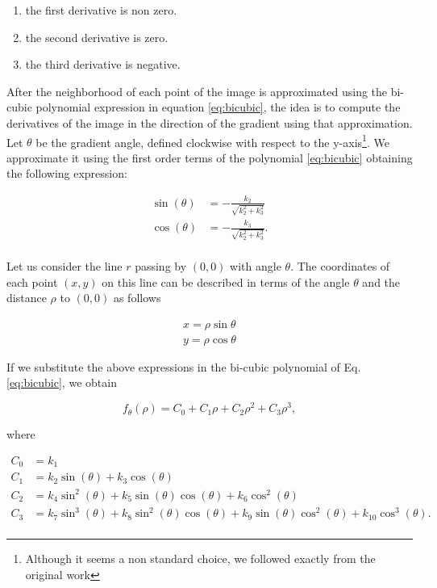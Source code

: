 \documentclass{ipol}
\numberwithin{equation}{section}
\numberwithin{table}{section}
\begin{document}
\begin{enumerate}
\item the first derivative is non zero.
\item the second derivative is zero.
\item the third derivative is negative.
\end{enumerate}

After the neighborhood of each point of the image is approximated using the bi-cubic polynomial expression in equation \ref{eq:bicubic}, the idea is to compute the derivatives of the image in the direction of the gradient using that approximation.\\

Let $\theta$ be the gradient angle, defined clockwise with respect to the y-axis\footnote{Although it seems a non standard choice, we followed exactly from the original work}. We approximate it using the first order terms of the polynomial \ref{eq:bicubic} obtaining the following expression:

\begin{align}
\label{eq:sincos}
	\sin(\theta) & = -\frac{k_2}{\sqrt{k_2^2 + k_3^2}} \nonumber \\
	\cos(\theta) & = -\frac{k_3}{\sqrt{k_2^2 + k_3^2}}. \\
\end{align}

Let us consider the line $r$ passing by $(0,0)$ with angle $\theta$. The coordinates of each point $(x,y)$ on this line can be described in terms of  the angle $\theta$ and the distance $\rho$ to $(0,0)$ as follows

\myn{\label{second:haralick:analytical:coordinates}} 
\begin{align*}
	x = \rho\sin{\theta} \\
	y = \rho\cos{\theta} 
\end{align*}

If we substitute the above expressions in the bi-cubic polynomial of Eq. \ref{eq:bicubic}, we obtain

\begin{equation}
	f_{\theta}(\rho) = C_0 + C_1\rho + C_2\rho^2 + C_3\rho^3 ,
\end{equation}

where

\begin{align}
\label{eq:c}
	C_0 & = k_1 \nonumber \nonumber \\
	C_1 & = k_2\sin(\theta) + k_3\cos(\theta) \nonumber \\
	C_2 & = k_4\sin^2(\theta) + k_5\sin(\theta)\cos(\theta) + k_6\cos^2(\theta) \nonumber \\
	C_3 & = k_7\sin^3(\theta) + k_8\sin^2(\theta)\cos(\theta) + k_9\sin(\theta)\cos^2(\theta) + k_{10}\cos^3(\theta). \nonumber \\
\end{align}
\end{document}
